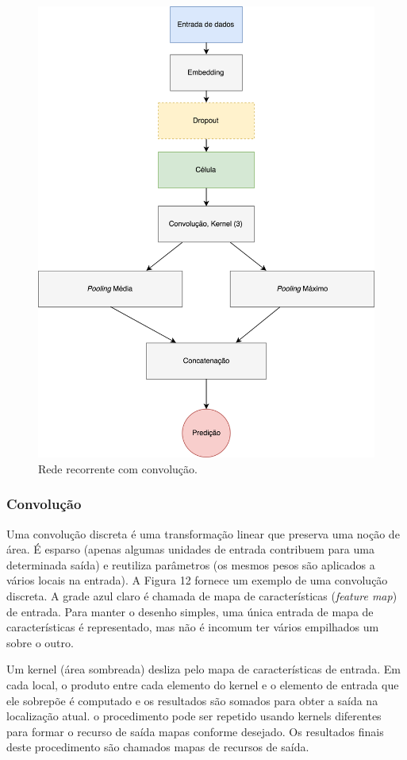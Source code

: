 \documentclass[12pt]{article}
\begin{document}
\begin{figure}[!htb]
\centering
\includegraphics[width=.5\textwidth]{images/graph.png}
\caption{Rede recorrente com convolução.}
\label{fig:graph}
\end{figure}
\FloatBarrier

\subsubsection{Convolução}

Uma convolução discreta é uma transformação linear que preserva uma noção de área. É esparso (apenas algumas unidades de entrada contribuem para uma determinada saída) e reutiliza parâmetros (os mesmos pesos são aplicados a vários locais na entrada). A Figura 12 fornece um exemplo de uma convolução discreta. A grade azul claro é chamada de mapa de características (\textit{feature map}) de entrada. Para manter o desenho simples, uma única entrada de mapa de características é representado, mas não é incomum ter vários empilhados um sobre o outro.

Um kernel (área sombreada) desliza pelo mapa de características de entrada. Em cada local, o produto entre cada elemento do kernel e o elemento de entrada que ele sobrepõe é computado e os resultados são somados para obter a saída na localização atual. o procedimento pode ser repetido usando kernels diferentes para formar o recurso de saída mapas conforme desejado. Os resultados finais deste procedimento são chamados mapas de recursos de saída. \cite{dumoulin2016guide}
\end{document}
